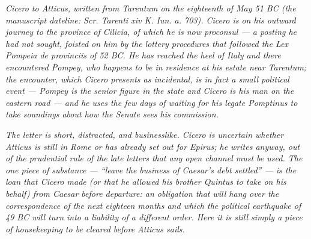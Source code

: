 
\textit{Cicero to Atticus, written from Tarentum on the
eighteenth of May 51 BC (the manuscript dateline:
\textit{Scr. Tarenti xiv K. Iun. a. 703}). Cicero is on
his outward journey to the province of Cilicia, of
which he is now proconsul --- a posting he had not
sought, foisted on him by the lottery procedures that
followed the Lex Pompeia de provinciis of 52 BC. He has
reached the heel of Italy and there encountered Pompey,
who happens to be in residence at his estate near
Tarentum; the encounter, which Cicero presents as
incidental, is in fact a small political event ---
Pompey is the senior figure in the state and Cicero is
his man on the eastern road --- and he uses the few
days of waiting for his legate Pomptinus to take soundings
about how the Senate sees his commission.}

\textit{The letter is short, distracted, and businesslike.
Cicero is uncertain whether Atticus is still in Rome or
has already set out for Epirus; he writes anyway, out of
the prudential rule of the late letters that any open
channel must be used. The one piece of substance ---
``leave the business of Caesar's debt settled'' --- is
the loan that Cicero made (or that he allowed his
brother Quintus to take on his behalf) from Caesar
before departure: an obligation that will hang over the
correspondence of the next eighteen months and which
the political earthquake of 49 BC will turn into a
liability of a different order. Here it is still simply
a piece of housekeeping to be cleared before Atticus
sails.}

